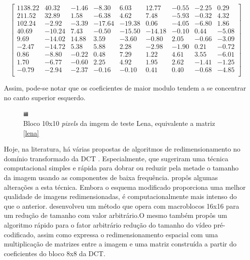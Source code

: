 \begin{center}
	\begin{equation}
\begin{bmatrix}
1138.22&	40.32&	-1.46&	-8.30&	6.03&	12.77&	-0.55&	-2.25&	0.29\\
211.52&	32.89&	1.58&	-6.38&	4.62&	7.48&	-5.93&	-0.32&	4.32\\
102.24&	-2.92&	-3.39&	-17.64&	-19.38&	0.06&	-4.05&	-6.80&	1.86\\	
40.69&	-10.24&	7.43&	-0.50&	-15.50&	-14.18&	-0.10&	0.44&	-5.08\\	
9.69&	-14.02&	14.88&	3.59&	-3.60&	-0.80&	2.05&	-0.66&	-3.09\\
-2.47&	-14.72&	5.38&	5.88&	2.28&	-2.98&	-1.90&	0.21&	-0.72\\
0.86&	-8.80&	-0.22&	0.48&	7.29&	1.22&	4.61&	3.55&	-6.01\\
1.70&	-6.77&	-0.60&	2.25&	4.92&	1.95&	2.62&	-1.41&	-1.25\\
-0.79&	-2.94&	-2.37&	-0.16&	-0.10&	0.41&	0.40&	-0.68&	-4.85\\
\end{bmatrix}	
	\end{equation}
\end{center}

\noindent Assim, pode-se notar que os coeficientes de maior modulo tendem a se concentrar no canto superior esquerdo. 

\begin{figure}[h]
	\centering
	\includegraphics[scale=4]{figuras/BLOCO.png}
	\caption{Bloco 10x10 \textit{pixels} da imgem de teste Lena, equivalente a matriz \ref{lena}}
	\label{PEDACO_LENA}
\end{figure}

Hoje, na literatura, há várias propostas de algoritmos de redimensionamento no domínio transformado da DCT \cite{patil2006fast2,chang1995manipulation,wang2010adaptive} . Especialmente,  que sugeriram uma técnica computacional simples e rápida para dobrar ou reduzir pela metade o tamanho da imagem usando as componentes de baixa frequência.  propôs algumas alterações a esta técnica. Embora o esquema modificado proporciona uma melhor qualidade de imagens redimensionadas, é computacionalmente mais intenso do que o anterior.  desenvolveu um método que opera com macroblocos 16x16 para um redução de tamanho com valor arbitrário.O mesmo também propôs  um algoritmo rápido para o fator arbitrário redução do tamanho do vídeo pré-codificado, assim como expressa o redimensionamento espacial com uma multiplicação de matrizes entre a imagem e uma matriz construída a partir do coeficientes do bloco 8x8 da DCT.

